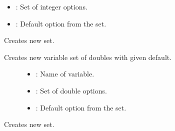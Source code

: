 \documentclass[letterpaper,10pt,english]{sphinxmanual}
\begin{document}
\begin{fulllineitems}
\begin{fulllineitems}
\begin{description}
\begin{itemize}
\item {} 
: Set of integer options. 

\item {} 
: Default option from the set. 

\end{itemize}

\end{description}


\end{fulllineitems}


\begin{fulllineitems}
\label{\detokenize{index:_CPPv2N7ostendo3Var3VarENSt6stringENSt6vectorIdEEi}}%
\pysigstartmultiline
{}\label{\detokenize{index:Pessumstructostendo_1_1Var_1ab359f9ded169486b261d4aca717acee1}}%
\pysigstopmultiline
Creates new {\hyperref[\detokenize{index:Pessumstructostendo_1_1Var}]{}} set. 

Creates new variable set of doubles with given default. \begin{description}
\item[{}] \leavevmode\begin{itemize}
\item {} 
: Name of variable. 

\item {} 
: Set of double options. 

\item {} 
: Default option from the set. 

\end{itemize}

\end{description}


\end{fulllineitems}


\begin{fulllineitems}
\label{\detokenize{index:_CPPv2N7ostendo3Var3VarENSt6stringENSt6vectorINSt6stringEEEi}}%
\pysigstartmultiline
{}\label{\detokenize{index:Pessumstructostendo_1_1Var_1af987ac6b851f5d62984e32f54850ae70}}%
\pysigstopmultiline
Creates new {\hyperref[\detokenize{index:Pessumstructostendo_1_1Var}]{}} set. 


\end{fulllineitems}
\end{fulllineitems}
\end{document}
